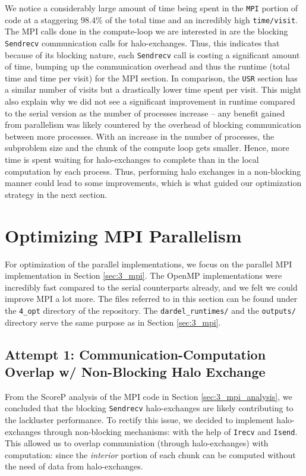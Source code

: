 \documentclass[a4paper,10pt]{article}
\begin{document}
We notice a considerably large amount of time being spent in the \verb|MPI| portion of code at a staggering $98.4\%$ of the total time and an incredibly high \verb|time/visit|. The MPI calls done in the compute-loop we are interested in are the blocking \verb|Sendrecv| communication calls for halo-exchanges. Thus, this indicates that because of its blocking nature, each \verb|Sendrecv| call is costing a significant amount of time, bumping up the communication overhead and thus the runtime (total time and time per visit) for the MPI section. In comparison, the \verb|USR| section has a similar number of visits but a drastically lower time spent per visit. This might also explain why we did not see a significant improvement in runtime compared to the serial version as the number of processes increase -- any benefit gained from parallelism was likely countered by the overhead of blocking communication between more processes. With an increase in the number of processes, the subproblem size and the chunk of the compute loop gets smaller. Hence, more time is spent waiting for halo-exchanges to complete than in the local computation by each process. Thus, performing halo exchanges in a non-blocking manner could lead to some improvements, which is what guided our optimization strategy in the next section.

\section{Optimizing MPI Parallelism}
For optimization of the parallel implementations, we focus on the parallel MPI implementation in Section \ref{sec:3_mpi}. The OpenMP implementations were incredibly fast compared to the serial counterparts already, and we felt we could improve MPI a lot more. The files referred to in this section can be found under the \verb|4_opt| directory of the repository. The \verb|dardel_runtimes/| and the \verb|outputs/| directory serve the same purpose as in Section \ref{sec:3_mpi}.

\subsection{Attempt 1: Communication-Computation Overlap w/ Non-Blocking Halo Exchange}
\label{sec:async_mpi}
From the ScoreP analysis of the MPI code in Section \ref{sec:3_mpi_analysis}, we concluded that the blocking \verb|Sendrecv| halo-exchanges are likely contributing to the lackluster performance. To rectify this issue, we decided to implement halo-exchanges through non-blocking mechanisms: with the help of \verb|Irecv| and \verb|Isend|. This allowed us to overlap communiation (through halo-exchanges) with computation: since the \textit{interior} portion of each chunk can be computed without the need of data from halo-exchanges.
\end{document}
